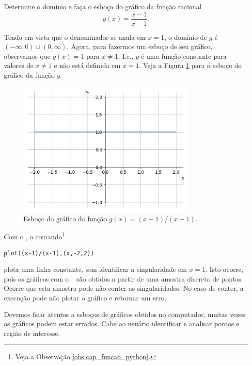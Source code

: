 \begin{exer}
  Determine o domínio e faça o esboço do gráfico da função racional
  \begin{equation}
    g(x) = \frac{x-1}{x-1}.
  \end{equation}
\end{exer}
\begin{resol}
  Tendo em vista que o denominador se anula em $x=1$, o domínio de $g$ é $(-\infty, 0)\cup (0, \infty)$. Agora, para fazermos um esboço de seu gráfico, observamos que $g(x)=1$ para $x\neq 1$. I.e., $g$ é uma função constante para valores de $x\neq 1$ e não está definida em $x=1$. Veja a Figura \ref{fig:exeresol_funracio_graf} para o esboço do gráfico da função $g$.

  \begin{figure}[H]
    \centering
    \includegraphics[width=0.8\textwidth]{./cap_funcao/dados/fig_exeresol_funracio_graf/fig_exeresol_funracio_graf}
    \caption{Esboço do gráfico da função $g(x) = (x-1)/(x-1)$.}
    \label{fig:exeresol_funracio_graf}
  \end{figure}

  \ifispython
  Com o \sympy, o comando\footnote{Veja a Observação \ref{obs:cap_funcao_python}.}
\begin{verbatim}
plot((x-1)/(x-1),(x,-2,2))
\end{verbatim}
  plota uma linha constante, sem identificar a singularidade em $x=1$. Isto ocorre, pois os gráficos com o \sympy~ são obtidos a partir de uma amostra discreta de pontos. Ocorre que esta amostra pode não conter as singularidades. No caso de conter, a execução pode não plotar o gráfico e retornar um erro.

  Devemos ficar atentos a esboços de gráficos obtidos no computador, muitas vezes os gráficos podem estar errados. Cabe ao usuário identificar e analisar pontos e região de interesse.
  \fi
\end{resol}

